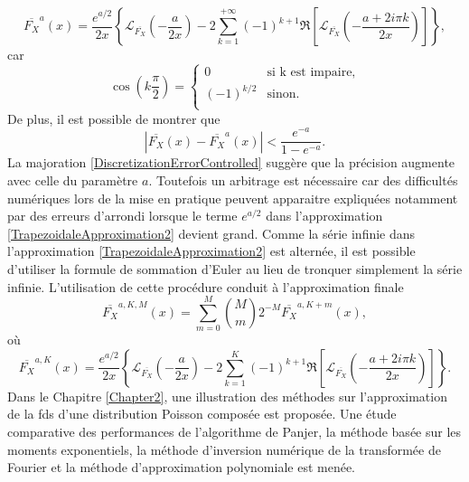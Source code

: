 \begin{equation}\label{TrapezoidaleApproximation2}
\overline{F_{X}}^{a}(x)=\frac{e^{a/2}}{2x}\left\{\mathcal{L}_{\overline{F_{X}}}\left(-\frac{a}{2x}\right)-2\sum_{k=1}^{+\infty}(-1)^{k+1}\Re\left[\mathcal{L}_{\overline{F_{X}}}\left(-\frac{a+2i\pi k}{2x}\right)\right]\right\},
\end{equation}
car 
\begin{equation*}
\cos\left(k\frac{\pi}{2}\right)=
\begin{cases}	
0 &\mbox{si k est impaire},  \\ 
(-1)^{k/2} & \mbox{sinon}. \\ 
\end{cases}
\end{equation*}
De plus, il est possible de montrer que 
\begin{equation}\label{DiscretizationErrorControlled}
|\overline{F_{X}}(x)-\overline{F_{X}}^{a}(x)|<\frac{e^{-a}}{1-e^{-a}}.
\end{equation}
La majoration \eqref{DiscretizationErrorControlled} suggère que la précision augmente avec celle du paramètre $a$. Toutefois un arbitrage est nécessaire car des difficultés numériques lors de la mise en pratique peuvent apparaitre expliquées notamment par des erreurs d\rq{}arrondi lorsque le terme $e^{a/2}$ dans l\rq{}approximation \eqref{TrapezoidaleApproximation2} devient grand. Comme la série infinie dans l\rq{}approximation \eqref{TrapezoidaleApproximation2} est alternée, il est possible d\rq{}utiliser la formule de sommation d\rq{}Euler au lieu de tronquer simplement la série infinie. L\rq{}utilisation de cette procédure conduit à l\rq{}approximation finale
\begin{equation}\label{TrapezoidaleApproximation3}
\overline{F_{X}}^{a,K,M}(x)=\sum_{m=0}^{M}\binom{M}{m}2^{-M}\overline{F_{X}}^{a,K+m}(x),
\end{equation} 
où
\begin{equation*}
\overline{F_{X}}^{a,K}(x)=\frac{e^{a/2}}{2x}\left\{\mathcal{L}_{\overline{F_{X}}}\left(-\frac{a}{2x}\right)-2\sum_{k=1}^{K}(-1)^{k+1}\Re\left[\mathcal{L}_{\overline{F_{X}}}\left(-\frac{a+2i\pi k}{2x}\right)\right]\right\}.
\end{equation*}
Dans le Chapitre \ref{Chapter2}, une illustration des méthodes sur l\rq{}approximation de la \gls{fds} d\rq{}une distribution Poisson composée est proposée. Une étude comparative des performances de l\rq{}algorithme de Panjer, la méthode basée sur les moments exponentiels, la méthode d\rq{}inversion numérique de la transformée de Fourier et la méthode d\rq{}approximation polynomiale est menée.\\

